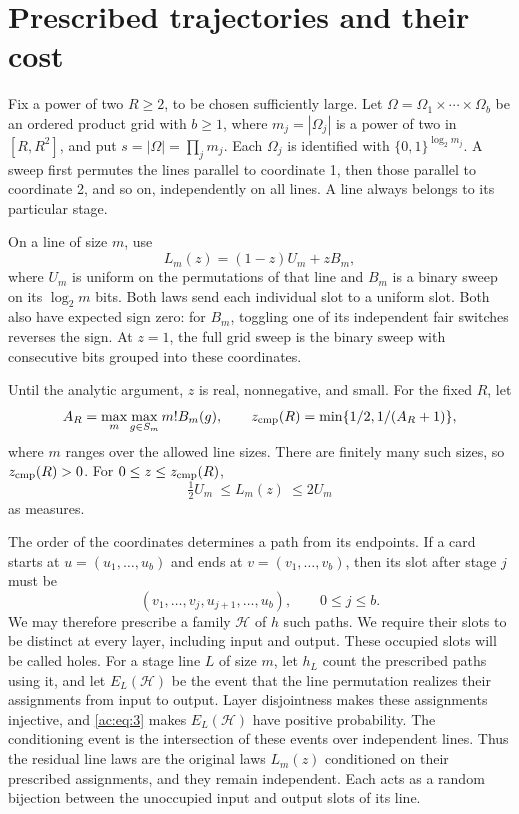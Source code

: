 \section{Prescribed trajectories and their cost}\label{sec:paths}
\label{ac:part:18}

Fix a power of two \(R\ge2\), to be chosen sufficiently large. Let
\(\Omega=\Omega_1\times\cdots\times\Omega_b\) be an ordered product grid with
\(b\ge1\), where \(m_j=|\Omega_j|\) is a power of two in \([R,R^2]\), and put
\(s=|\Omega|=\prod_jm_j\). Each \(\Omega_j\) is identified with
\(\{0,1\}^{\log_2m_j}\). A sweep first permutes the lines parallel to coordinate 1,
then those parallel to coordinate 2, and so on, independently on all lines.
A line always belongs to its particular stage.

On a line of size \(m\), use
\begin{equation}
 L_m(z)=(1-z)U_m+zB_m,
 \label{ac:eq:2}
\end{equation}
where \(U_m\) is uniform on the permutations of that line and \(B_m\) is a
binary sweep on its \(\log_2m\) bits. Both laws send each individual slot to a
uniform slot. Both also have expected sign zero: for \(B_m\), toggling one of
its independent fair switches reverses the sign. At \(z=1\), the full grid
sweep is the binary sweep with consecutive bits grouped into these
coordinates.

Until the analytic argument, \(z\) is real, nonnegative, and small. For the
fixed \(R\), let
\[
 A_R=\max_m\max_{g\in S_m}m!B_m(g),\qquad
 z_{\rm cmp}(R)=\min\{1/2,1/(A_R+1)\},
\]
where \(m\) ranges over the allowed line sizes. There are finitely many such
sizes, so \(z_{\rm cmp}(R)>0\). For \(0\le z\le z_{\rm cmp}(R)\),
\begin{equation}
 \tfrac12U_m\ \le L_m(z)\ \le 2U_m
 \label{ac:eq:3}
\end{equation}
as measures.

The order of the coordinates determines a path from its endpoints. If a card
starts at \(u=(u_1,\ldots,u_b)\) and ends at \(v=(v_1,\ldots,v_b)\), then its
slot after stage \(j\) must be
\[
 (v_1,\ldots,v_j,u_{j+1},\ldots,u_b),\qquad 0\le j\le b.
\]
We may therefore prescribe a family \(\mathcal H\) of \(h\) such paths.
We require their slots to be distinct at every layer, including input and
output. These occupied slots will be called holes. For a stage line \(L\) of
size \(m\), let \(h_L\) count the prescribed paths using it, and let
\(E_L(\mathcal H)\) be the event that the line permutation realizes their
assignments from input to output. Layer disjointness makes these assignments
injective, and \eqref{ac:eq:3} makes \(E_L(\mathcal H)\) have positive
probability. The conditioning event is the intersection of these events over
independent lines. Thus the residual line laws are the original laws
\(L_m(z)\) conditioned on their prescribed assignments, and they remain
independent. Each acts as a random bijection between the unoccupied input and
output slots of its line.

